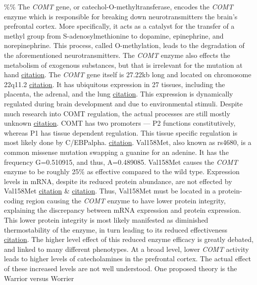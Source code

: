 \documentclass[letterpaper]{article}
\begin{document}
\%\% The \emph{COMT} gene, or catechol-O-methyltransferase, encodes the \emph{COMT}
enzyme which is responsible for breaking down neurotransmitters the
brain's prefrontal cortex. More specifically, it acts as a catalyst for
the transfer of a methyl group from S-adenosylmethionine to dopamine,
epinephrine, and norepinephrine. This process, called O-methylation,
leads to the degradation of the aforementioned neurotransmitters. The
\emph{COMT} enzyme also effects the metabolism of exogenous substances, but
that is irrelevant for the mutation at hand
\href{https://www.ncbi.nlm.nih.gov/gene/1312}{citation}. The \emph{COMT} gene
itself is 27.22kb long and located on chromosome 22q11.2
\href{https://pubmed.ncbi.nlm.nih.gov/1572656/}{citation}. It has
ubiquitous expression in 27 tissues, including the placenta, the
adrenal, and the lung
\href{https://www.ncbi.nlm.nih.gov/gene/1312\#gene-expression}{citation}.
This expression is dynamically regulated during brain development and
due to environmental stimuli. Despite much research into COMT
regulation, the actual processes are still mostly unknown
\href{https://pubmed.ncbi.nlm.nih.gov/21095457/}{citation}. COMT has two
promoters --- P2 functions constitutively, whereas P1 has tissue
dependent regulation. This tissue specific regulation is most likely
done by C/EBPalpha.
\href{https://pubmed.ncbi.nlm.nih.gov/8672242/}{citation}. Val158Met, also
known as rs4680, is a common missense mutation swapping a guanine for an
adenine. It has the frequency G=0.510915, and thus, A=0.489085.
Val158Met causes the \emph{COMT} enzyme to be roughly 25\% as effective
compared to the wild type. Expression levels in mRNA, despite its
reduced protein abundance, are not effected by Val158Met
\href{https://www.hindawi.com/journals/dm/2020/8850859/}{citation} \&
\href{https://www.cell.com/ajhg/fulltext/S0002-9297(07)63786-0}{citation}.
Thus, Val158Met must be located in a protein-coding region causing the
\emph{COMT} enzyme to have lower protein integrity, explaining the
discrepancy between mRNA expression and protein expression. This lower
protein integrity is most likely manifested as diminished
thermostability of the enzyme, in turn leading to its reduced
effectiveness \href{https://pubmed.ncbi.nlm.nih.gov/7703232/}{citation}.
The higher level effect of this reduced enzyme efficacy is greatly
debated, and linked to many different phenotypes. At a broad level,
lower \emph{COMT} activity leads to higher levels of catecholamines in the
prefrontal cortex. The actual effect of these increased levels are not
well understood. One proposed theory is the Warrior versus Worrier
\end{document}
